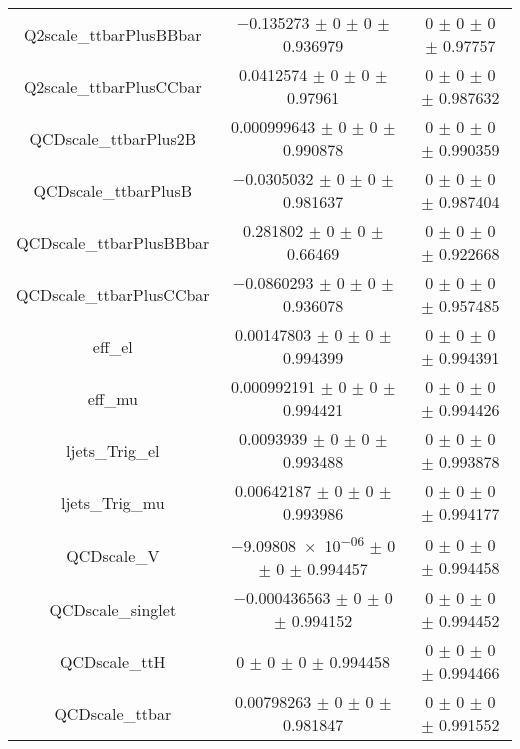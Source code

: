 \begin{table}
\begin{tabular}{ccc}
Q2scale\_ttbarPlusBBbar & \num{-0.135273} $\pm$ \num{0} $\pm$ \num{0} $\pm$ \num{0.936979} & \num{0} $\pm$ \num{0} $\pm$ \num{0} $\pm$ \num{0.97757}\\
Q2scale\_ttbarPlusCCbar & \num{0.0412574} $\pm$ \num{0} $\pm$ \num{0} $\pm$ \num{0.97961} & \num{0} $\pm$ \num{0} $\pm$ \num{0} $\pm$ \num{0.987632}\\
QCDscale\_ttbarPlus2B & \num{0.000999643} $\pm$ \num{0} $\pm$ \num{0} $\pm$ \num{0.990878} & \num{0} $\pm$ \num{0} $\pm$ \num{0} $\pm$ \num{0.990359}\\
QCDscale\_ttbarPlusB & \num{-0.0305032} $\pm$ \num{0} $\pm$ \num{0} $\pm$ \num{0.981637} & \num{0} $\pm$ \num{0} $\pm$ \num{0} $\pm$ \num{0.987404}\\
QCDscale\_ttbarPlusBBbar & \num{0.281802} $\pm$ \num{0} $\pm$ \num{0} $\pm$ \num{0.66469} & \num{0} $\pm$ \num{0} $\pm$ \num{0} $\pm$ \num{0.922668}\\
QCDscale\_ttbarPlusCCbar & \num{-0.0860293} $\pm$ \num{0} $\pm$ \num{0} $\pm$ \num{0.936078} & \num{0} $\pm$ \num{0} $\pm$ \num{0} $\pm$ \num{0.957485}\\
eff\_el & \num{0.00147803} $\pm$ \num{0} $\pm$ \num{0} $\pm$ \num{0.994399} & \num{0} $\pm$ \num{0} $\pm$ \num{0} $\pm$ \num{0.994391}\\
eff\_mu & \num{0.000992191} $\pm$ \num{0} $\pm$ \num{0} $\pm$ \num{0.994421} & \num{0} $\pm$ \num{0} $\pm$ \num{0} $\pm$ \num{0.994426}\\
ljets\_Trig\_el & \num{0.0093939} $\pm$ \num{0} $\pm$ \num{0} $\pm$ \num{0.993488} & \num{0} $\pm$ \num{0} $\pm$ \num{0} $\pm$ \num{0.993878}\\
ljets\_Trig\_mu & \num{0.00642187} $\pm$ \num{0} $\pm$ \num{0} $\pm$ \num{0.993986} & \num{0} $\pm$ \num{0} $\pm$ \num{0} $\pm$ \num{0.994177}\\
QCDscale\_V & \num{-9.09808e-06} $\pm$ \num{0} $\pm$ \num{0} $\pm$ \num{0.994457} & \num{0} $\pm$ \num{0} $\pm$ \num{0} $\pm$ \num{0.994458}\\
QCDscale\_singlet & \num{-0.000436563} $\pm$ \num{0} $\pm$ \num{0} $\pm$ \num{0.994152} & \num{0} $\pm$ \num{0} $\pm$ \num{0} $\pm$ \num{0.994452}\\
QCDscale\_ttH & \num{0} $\pm$ \num{0} $\pm$ \num{0} $\pm$ \num{0.994458} & \num{0} $\pm$ \num{0} $\pm$ \num{0} $\pm$ \num{0.994466}\\
QCDscale\_ttbar & \num{0.00798263} $\pm$ \num{0} $\pm$ \num{0} $\pm$ \num{0.981847} & \num{0} $\pm$ \num{0} $\pm$ \num{0} $\pm$ \num{0.991552}\\

\end{tabular}
\end{table}
